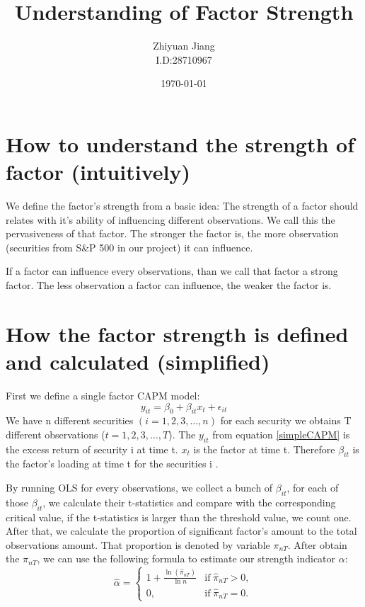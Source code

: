 \documentclass[12pt]{article}
\title{Understanding of Factor Strength}
\author{Zhiyuan Jiang\\I.D:28710967}
\date{\today}
\begin{document}
	\maketitle	
		\section{How to understand the strength of factor (intuitively)}
We define the factor's strength from a basic idea: The strength of a factor should relates with it's ability of influencing different observations. We call this the pervasiveness of that factor. The stronger the factor is, the more observation (securities from S\&P 500 in our project) it can influence. 

If a factor can influence every observations, than we call that factor a strong factor. The less observation a factor can influence, the weaker the factor is. 

	\section{How the factor strength is defined and calculated (simplified)}
First we define a single factor CAPM model:
\[  y_{it} = \beta_0 + \beta_{it}x_t + \epsilon_{it}  \tag{1}\label{simpleCAPM} \]
We have n different securities $(i = 1, 2, 3, \dots , n)$ for each security we obtains T different observations ($t = 1, 2, 3, \dots, T$). The $y_{it}$ from equation \eqref{simpleCAPM} is the excess return of security i at time t. $x_t$ is the factor at time t. Therefore $\beta_{it}$ is the factor's loading at time t for the securities i .

By running OLS for every observations, we collect a bunch of $\beta_{it}$, for each of those $\beta_{it}$, we calculate their t-statistics and compare with the corresponding critical value, if the t-statistics is larger than the threshold value, we count one. After that, we calculate the proportion of significant factor's amount to the total observations amount. That proportion is denoted by variable $\pi_{nT} $. After obtain the $\pi_{nT}$, we can use the following formula to estimate our strength indicator $\alpha$:
\[ \hat{\alpha} = \begin{cases}
1+\frac{\ln(\hat{\pi}_{nT})}{\ln n} & \text{if}\; \hat{\pi}_{nT} > 0,\\
	0, & \text{if}\; \hat{\pi}_{nT} = 0.
\end{cases} \]

\cite{Bailey2020}
\cite{Bailey2016}



\end{document}

